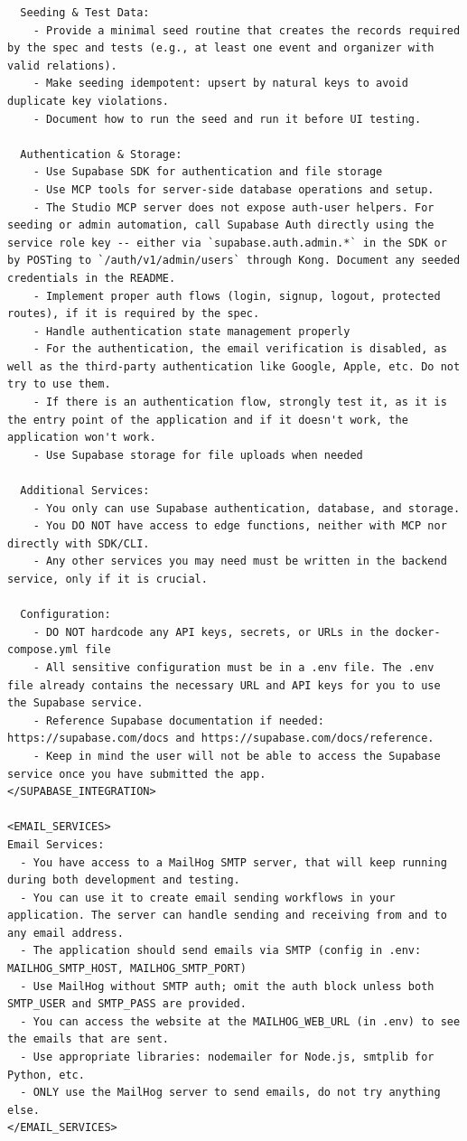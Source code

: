 \begin{lstlisting}
  Seeding & Test Data:
    - Provide a minimal seed routine that creates the records required by the spec and tests (e.g., at least one event and organizer with valid relations).
    - Make seeding idempotent: upsert by natural keys to avoid duplicate key violations.
    - Document how to run the seed and run it before UI testing.

  Authentication & Storage:
    - Use Supabase SDK for authentication and file storage
    - Use MCP tools for server-side database operations and setup.
    - The Studio MCP server does not expose auth-user helpers. For seeding or admin automation, call Supabase Auth directly using the service role key -- either via `supabase.auth.admin.*` in the SDK or by POSTing to `/auth/v1/admin/users` through Kong. Document any seeded credentials in the README.
    - Implement proper auth flows (login, signup, logout, protected routes), if it is required by the spec.
    - Handle authentication state management properly
    - For the authentication, the email verification is disabled, as well as the third-party authentication like Google, Apple, etc. Do not try to use them.
    - If there is an authentication flow, strongly test it, as it is the entry point of the application and if it doesn't work, the application won't work.
    - Use Supabase storage for file uploads when needed

  Additional Services:
    - You only can use Supabase authentication, database, and storage.
    - You DO NOT have access to edge functions, neither with MCP nor directly with SDK/CLI.
    - Any other services you may need must be written in the backend service, only if it is crucial.

  Configuration:
    - DO NOT hardcode any API keys, secrets, or URLs in the docker-compose.yml file
    - All sensitive configuration must be in a .env file. The .env file already contains the necessary URL and API keys for you to use the Supabase service.
    - Reference Supabase documentation if needed: https://supabase.com/docs and https://supabase.com/docs/reference.
    - Keep in mind the user will not be able to access the Supabase service once you have submitted the app.
</SUPABASE_INTEGRATION>

<EMAIL_SERVICES>
Email Services:
  - You have access to a MailHog SMTP server, that will keep running during both development and testing.
  - You can use it to create email sending workflows in your application. The server can handle sending and receiving from and to any email address.
  - The application should send emails via SMTP (config in .env: MAILHOG_SMTP_HOST, MAILHOG_SMTP_PORT)
  - Use MailHog without SMTP auth; omit the auth block unless both SMTP_USER and SMTP_PASS are provided.
  - You can access the website at the MAILHOG_WEB_URL (in .env) to see the emails that are sent.
  - Use appropriate libraries: nodemailer for Node.js, smtplib for Python, etc.
  - ONLY use the MailHog server to send emails, do not try anything else.
</EMAIL_SERVICES>


\end{lstlisting}
